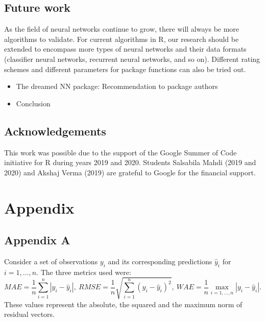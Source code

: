 \hypertarget{future-work}{%
\subsection{Future work}\label{future-work}}

As the field of neural networks continue to grow, there will always be
more algorithms to validate. For current algorithms in \textsf{R}, our
research should be extended to encompass more types of neural networks
and their data formats (classifier neural networks, recurrent neural
networks, and so on). Different rating schemes and different parameters
for package functions can also be tried out.

\begin{itemize}
\tightlist
\item
  The dreamed NN package: Recommendation to package authors
\item
  Conclusion
\end{itemize}

\hypertarget{acknowledgements}{%
\subsection{Acknowledgements}\label{acknowledgements}}

This work was possible due to the support of the Google Summer of Code
initiative for R during years 2019 and 2020. Students Salsabila Mahdi
(2019 and 2020) and Akshaj Verma (2019) are grateful to Google for the
financial support.



\hypertarget{appendix}{%
\section{Appendix}\label{appendix}}

\hypertarget{appendix-a}{%
\subsection{Appendix A}\label{appendix-a}}

Consider a set of observations \(y_i\) and its corresponding predictions
\(\hat y_i\) for \(i=1,\dots,n\). The three metrics used were: \[
MAE = \frac1n\sum_{i=1}^n|y_i - \hat y_i|,~
RMSE = \frac1n\sqrt{\sum_{i=1}^n(y_i - \hat y_i)^2},~
WAE = \frac1n\max_{i=1,\dots,n}|y_i - \hat y_i|.
\] These values represent the absolute, the squared and the maximum norm
of residual vectors.

